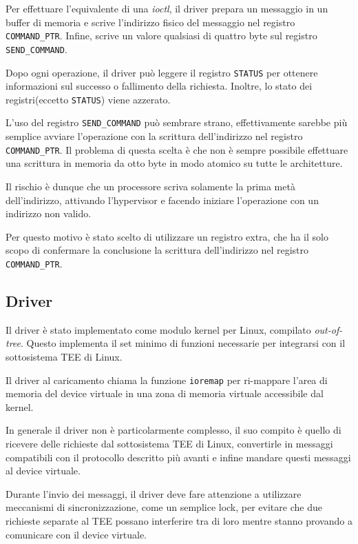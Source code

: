 \documentclass[12pt,italian]{report}
\begin{document}
Per effettuare l'equivalente di una \textit{ioctl}, il driver
prepara un messaggio in un buffer di memoria e scrive l'indirizzo
fisico del messaggio nel registro \texttt{COMMAND\_PTR}.
Infine, scrive un valore qualsiasi di quattro byte sul registro
\texttt{SEND\_COMMAND}.

Dopo ogni operazione, il driver può leggere il registro \texttt{STATUS}
per ottenere informazioni sul successo o fallimento della richiesta.
Inoltre, lo stato dei registri(eccetto \texttt{STATUS}) viene azzerato.

\bigbreak \noindent

L'uso del registro \texttt{SEND\_COMMAND} può sembrare strano,
effettivamente sarebbe più semplice avviare l'operazione con la
scrittura dell'indirizzo nel registro \texttt{COMMAND\_PTR}.
Il problema di questa scelta è che non è sempre possibile effettuare
una scrittura in memoria da otto byte in modo atomico su tutte le
architetture.

Il rischio è dunque che un processore scriva solamente la prima metà
dell'indirizzo, attivando l'hypervisor e facendo iniziare l'operazione
con un indirizzo non valido.

Per questo motivo è stato scelto di utilizzare un registro extra, che
ha il solo scopo di confermare la conclusione la scrittura dell'indirizzo
nel registro \texttt{COMMAND\_PTR}.

\subsection{Driver}
\label{subsection:driver}
Il driver è stato implementato come modulo kernel per Linux, compilato
\textit{out-of-tree}.
Questo implementa il set minimo di funzioni necessarie per integrarsi con
il sottosistema TEE di Linux.

Il driver al caricamento chiama la funzione \texttt{ioremap} per ri-mappare
l'area di memoria del device virtuale in una zona di memoria virtuale
accessibile dal kernel.

In generale il driver non è particolarmente complesso, il suo compito è
quello di ricevere delle richieste dal sottosistema TEE di Linux, convertirle
in messaggi compatibili con il protocollo descritto più avanti e infine
mandare questi messaggi al device virtuale.

Durante l'invio dei messaggi, il driver deve fare attenzione a utilizzare
meccanismi di sincronizzazione, come un semplice lock, per evitare che due
richieste separate al TEE possano interferire tra di loro mentre stanno
provando a comunicare con il device virtuale.
\end{document}
